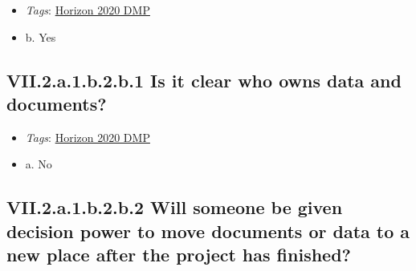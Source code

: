 \documentclass[a4paper,12pt]{report}
\begin{document}
\begin{itemize}
  \item \textit{Tags}: \ul{Horizon 2020 DMP}
  \end{itemize}




\begin{itemize}
  \item[\CheckmarkBold] b. Yes
\end{itemize}




\subsection*{\protect\textcolor{colorSecId}{VII.2.a.1.b.2.b.1} Is it clear who owns data and documents?}

\label{6be88f7c-f868-460f-bba7-91e1c659adfd.a549d10b-aa46-4c0c-863f-30219ac5ecce.b3739ebd-2d8e-42d3-9425-a7d6d1b26c79.c010e830-bd89-460d-9498-cb41e7ffeb87.aac95530-2978-4759-803b-64721533faf0.a18d79d2-74b1-4524-a3c7-2c1a87b66a75.2ffa365d-83f6-4adb-bcc6-377fec82a297.b4f9916a-c846-49ff-bfd2-f5d1346de553}


\begin{itemize}
  \item \textit{Tags}: \ul{Horizon 2020 DMP}
  \end{itemize}




\begin{itemize}
  \item[\CheckmarkBold] a. No
\end{itemize}




\subsection*{\protect\textcolor{colorSecId}{VII.2.a.1.b.2.b.2} Will someone be given decision power to move documents or data to a new place after the project has finished?}

\label{6be88f7c-f868-460f-bba7-91e1c659adfd.a549d10b-aa46-4c0c-863f-30219ac5ecce.b3739ebd-2d8e-42d3-9425-a7d6d1b26c79.c010e830-bd89-460d-9498-cb41e7ffeb87.aac95530-2978-4759-803b-64721533faf0.a18d79d2-74b1-4524-a3c7-2c1a87b66a75.2ffa365d-83f6-4adb-bcc6-377fec82a297.c9ed4379-19e2-4ce3-8962-5c2fca69b6cd}
\end{document}
